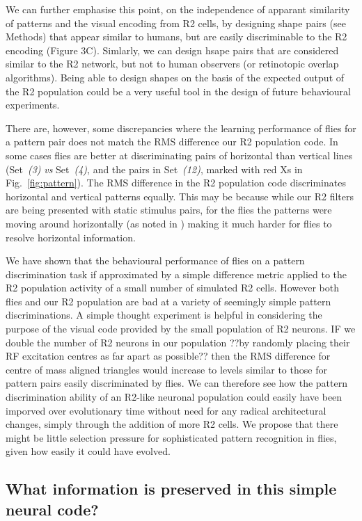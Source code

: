 We can further emphasise this point, on the independence of apparant similarity of patterns and the visual encoding from R2 cells, by designing shape pairs (see Methods) that appear similar to humans, but are easily discriminable to the R2 encoding (Figure 3C). Simlarly, we can design hsape pairs that are considered similar to the R2 network, but not to human observers (or retinotopic overlap algorithms). Being able to design shapes on the basis of the expected output of the R2 population could be a very useful tool in the design of future behavioural experiments.

There are, however, some discrepancies where the learning performance of flies for a pattern pair does not match the RMS difference our R2 population code. In some cases flies are better at discriminating pairs of horizontal than vertical lines (Set~\emph{(3)} \emph{vs} Set~\emph{(4)}, and the pairs in Set~\emph{(12)}, marked with red Xs in Fig.~\ref{fig:pattern}). The RMS difference in the R2 population code discriminates horizontal and vertical patterns equally. This may be because while our R2 filters are being presented with static stimulus pairs, for the flies the patterns were moving around horizontally (as noted in \cite{Ernst1999}) making it much harder for flies to resolve horizontal information.

We have shown that the behavioural performance of flies on a pattern discrimination task if approximated by a simple difference metric applied to the R2 population activity of a small number of simulated R2 cells. However both flies and our R2 population are bad at a variety of seemingly simple pattern discriminations. A simple thought experiment is helpful in considering the purpose of the visual code provided by the small population of R2 neurons. IF we double the number of R2 neurons in our population ??by randomly placing their RF excitation centres as far apart as possible?? then the RMS difference for centre of mass aligned triangles would increase to levels similar to those for pattern pairs easily discriminated by flies. We can therefore see how the pattern discrimination ability of an R2-like neuronal population could easily have been imporved over evolutionary time without need for any radical architectural changes, simply through the addition of more R2 cells. We propose that there might be little selection pressure for sophisticated pattern recognition in flies, given how easily it could have evolved.

\subsection*{What information is preserved in this simple neural code?}

